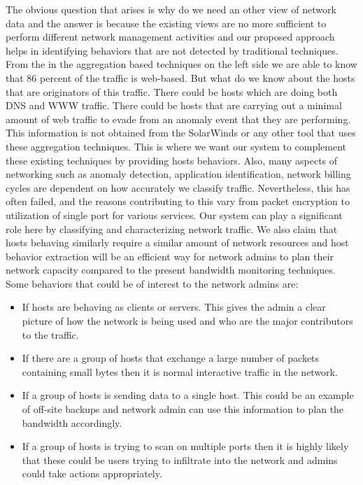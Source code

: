 The obvious question that arises is why do we need an other view of network data and the answer is because the existing views are no more sufficient to perform different network management activities and our proposed approach helps in identifying behaviors that are not detected by traditional techniques. From the  in the aggregation based techniques on the left side we are able to know that 86 percent of the traffic is web-based. But what do we know about the hosts that are originators of this traffic. There could be hosts which are doing both DNS and WWW traffic. There could be hosts that are carrying out a minimal amount of web traffic to evade from an anomaly event that they are performing. This information is not obtained from the SolarWinds or any other tool that uses these aggregation techniques. This is where we want our system to complement these existing techniques by providing hosts behaviors. Also, many aspects of networking such as anomaly detection, application identification, network billing cycles are dependent on how accurately we classify traffic. Nevertheless, this has often failed, and the reasons contributing to this vary from packet encryption to utilization of single port for various services. Our system can play a significant role here by classifying and characterizing network traffic.
We also claim that hosts behaving similarly require a similar amount of network resources and host behavior extraction will be an efficient way for network admins to plan their network capacity compared to the present bandwidth monitoring techniques. Some behaviors that could be of interest to the network admins are:


\begin{itemize}
	\item If hosts are behaving as clients or servers. This gives the admin a clear picture of how the network is being used and who are the major contributors to the traffic.
	\item If there are a group of hosts that exchange a large number of packets containing small bytes then it is normal interactive traffic in the network.	
	\item If a group of hosts is sending data to a single host. This could be an example of off-site backups and network admin can use this information to plan the bandwidth accordingly.
	\item If a group of hosts is trying to scan on multiple ports then it is highly likely that these could be users trying to infiltrate into the network and admins could take actions appropriately.
	
\end{itemize}


